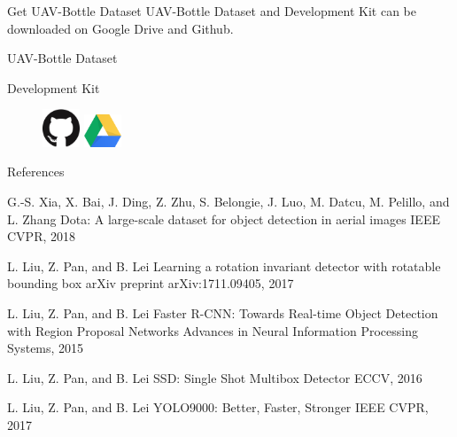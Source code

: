\documentclass[newPxFont,fullfooter,sectionpages, progressbar]{beamer}
\begin{document}
\begin{frame}[c]{Get UAV-Bottle Dataset}
	\vspace{10mm}
	UAV-Bottle Dataset and Development Kit can be downloaded on Google Drive and Github. \\
\vspace{1em}
\begin{center}
	\large{UAV-Bottle Dataset}

	\large{Development Kit}
	\vspace{1.5em}

	\begin{figure}
		\centerline{
			\includegraphics[width=0.1\textwidth]{GitHub-Mark-120px-plus.png}
			\hspace{1.5cm}
			\includegraphics[width=0.1\textwidth]{images/Google_Drive_Logo.png}
			}
	\end{figure}
	
\end{center}
\end{frame}

\begin{frame}{References}
	\begin{thebibliography}{10}
	\scriptsize
	\beamertemplatearticlebibitems
	G.-S. Xia, X. Bai, J. Ding, Z. Zhu, S. Belongie, J. Luo, M. Datcu,
	M. Pelillo, and L. Zhang
	\newblock Dota: A large-scale dataset for object
detection in aerial images
	\newblock IEEE CVPR, 2018

	\beamertemplatearticlebibitems
	L. Liu, Z. Pan, and B. Lei
	\newblock Learning a rotation invariant detector with
rotatable bounding box
	\newblock arXiv preprint arXiv:1711.09405, 2017
	
	\beamertemplatearticlebibitems
	L. Liu, Z. Pan, and B. Lei
	\newblock Faster R-CNN: Towards Real-time
Object Detection with Region Proposal Networks
	\newblock Advances in Neural
Information Processing Systems, 2015
	
	\beamertemplatearticlebibitems
	L. Liu, Z. Pan, and B. Lei
	\newblock SSD: Single Shot Multibox Detector
	\newblock ECCV, 2016
	
	\beamertemplatearticlebibitems
	L. Liu, Z. Pan, and B. Lei
	\newblock YOLO9000: Better, Faster, Stronger
	\newblock IEEE CVPR, 2017

  \end{thebibliography}
\end{frame}

\begingroup
{}
\begin{frame}[plain]
\vspace{1.4cm}

\end{frame}
\endgroup
\end{document}
